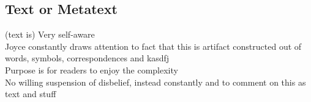 \documentclass[12pt]{article}
\begin{document}
		\subsection{Text or Metatext}
			(text is) Very self-aware \\
			Joyce constantly draws attention to fact that this is
			artifact constructed out of words, symbols,
			correspondences and kasdfj \\
			Purpose is for readers to enjoy the complexity \\
			No willing suspension of disbelief, instead constantly
			and to comment on this as text and stuff
\end{document}
